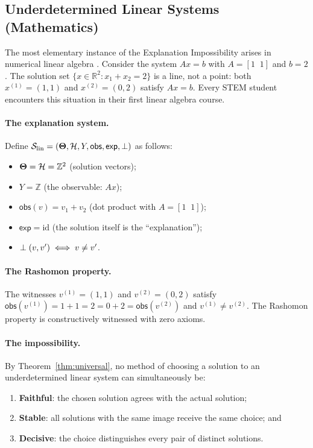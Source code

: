 \subsection{Underdetermined Linear Systems (Mathematics)}
\label{sec:instance-linear-system}

The most elementary instance of the Explanation Impossibility arises in
numerical linear algebra \citep{strang2016introduction}.  Consider the system $Ax = b$ with $A = [1\;\;1]$
and $b = 2$.  The solution set $\{x \in \mathbb{R}^2 : x_1 + x_2 = 2\}$ is a
line, not a point: both $x^{(1)} = (1,1)$ and $x^{(2)} = (0,2)$ satisfy
$Ax = b$.  Every STEM student encounters this situation in their first
linear algebra course.

\paragraph{The explanation system.}
Define $\mathcal{S}_{\mathrm{lin}} = (\mathbf{\Theta}, \mathcal{H}, Y, \mathsf{obs},
\mathsf{exp}, \perp)$ as follows:
\begin{itemize}
  \item $\mathbf{\Theta} = \mathcal{H} = \mathbb{Z}^2$ (solution vectors);
  \item $Y = \mathbb{Z}$ (the observable: $Ax$);
  \item $\mathsf{obs}(v) = v_1 + v_2$ (dot product with $A = [1\;\;1]$);
  \item $\mathsf{exp} = \mathrm{id}$ (the solution itself is the ``explanation'');
  \item $\perp(v, v') \iff v \ne v'$.
\end{itemize}

\paragraph{The Rashomon property.}
The witnesses $v^{(1)} = (1,1)$ and $v^{(2)} = (0,2)$ satisfy
$\mathsf{obs}(v^{(1)}) = 1 + 1 = 2 = 0 + 2 = \mathsf{obs}(v^{(2)})$
and $v^{(1)} \ne v^{(2)}$.  The Rashomon property is constructively witnessed
with zero axioms.

\paragraph{The impossibility.}
By Theorem~\ref{thm:universal}, no method of choosing a solution to an
underdetermined linear system can simultaneously be:
\begin{enumerate}
  \item \textbf{Faithful}: the chosen solution agrees with the actual solution;
  \item \textbf{Stable}: all solutions with the same image receive the same
    choice; and
  \item \textbf{Decisive}: the choice distinguishes every pair of distinct
    solutions.
\end{enumerate}

